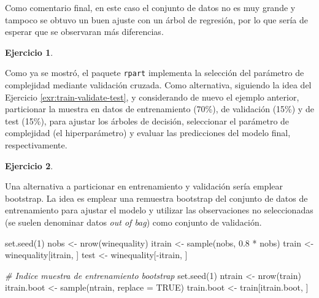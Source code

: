 \documentclass[
  spanish,
]{book}
\newenvironment{Shaded}{\begin{snugshade}}{\end{snugshade}}
\newcommand{\AttributeTok}[1]{\textcolor[rgb]{0.77,0.63,0.00}{#1}}
\newcommand{\CommentTok}[1]{\textcolor[rgb]{0.56,0.35,0.01}{\textit{#1}}}
\newcommand{\ConstantTok}[1]{\textcolor[rgb]{0.00,0.00,0.00}{#1}}
\newcommand{\DecValTok}[1]{\textcolor[rgb]{0.00,0.00,0.81}{#1}}
\newcommand{\FloatTok}[1]{\textcolor[rgb]{0.00,0.00,0.81}{#1}}
\newcommand{\FunctionTok}[1]{\textcolor[rgb]{0.00,0.00,0.00}{#1}}
\newcommand{\NormalTok}[1]{#1}
\newcommand{\OtherTok}[1]{\textcolor[rgb]{0.56,0.35,0.01}{#1}}
\newcommand{\SpecialCharTok}[1]{\textcolor[rgb]{0.00,0.00,0.00}{#1}}
\theoremstyle{break}
\theoremstyle{definition}
\theoremstyle{definition}
\theoremstyle{definition}
\newtheorem{exercise}{Ejercicio}[chapter]
\theoremstyle{definition}
\theoremstyle{remark}
\begin{document}
Como comentario final, en este caso el conjunto de datos no es muy grande y tampoco se obtuvo un buen ajuste con un árbol de regresión, por lo que sería de esperar que se observaran más diferencias.

\begin{exercise}
\protect\hypertarget{exr:train-validate-test-tree}{}{\label{exr:train-validate-test-tree} }
\end{exercise}

Como ya se mostró, el paquete \texttt{rpart} implementa la selección del parámetro de complejidad mediante validación cruzada.
Como alternativa, siguiendo la idea del Ejercicio \ref{exr:train-validate-test}, y considerando de nuevo el ejemplo anterior, particionar la muestra en datos de entrenamiento (70\%), de validación (15\%) y de test (15\%), para ajustar los árboles de decisión, seleccionar el parámetro de complejidad (el hiperparámetro) y evaluar las predicciones del modelo final, respectivamente.

\begin{exercise}
\protect\hypertarget{exr:train-boot-tree}{}{\label{exr:train-boot-tree} }
\end{exercise}

Una alternativa a particionar en entrenamiento y validación sería emplear bootstrap.
La idea es emplear una remuestra bootstrap del conjunto de datos de entrenamiento para ajustar el modelo y utilizar las observaciones no seleccionadas (se suelen denominar datos \emph{out of bag}) como conjunto de validación.

\begin{Shaded}
\begin{Highlighting}[]
\FunctionTok{set.seed}\NormalTok{(}\DecValTok{1}\NormalTok{)}
\NormalTok{nobs }\OtherTok{\textless{}{-}} \FunctionTok{nrow}\NormalTok{(winequality)}
\NormalTok{itrain }\OtherTok{\textless{}{-}} \FunctionTok{sample}\NormalTok{(nobs, }\FloatTok{0.8} \SpecialCharTok{*}\NormalTok{ nobs)}
\NormalTok{train }\OtherTok{\textless{}{-}}\NormalTok{ winequality[itrain, ]}
\NormalTok{test }\OtherTok{\textless{}{-}}\NormalTok{ winequality[}\SpecialCharTok{{-}}\NormalTok{itrain, ]}

\CommentTok{\# Indice muestra de entrenamiento bootstrap}
\FunctionTok{set.seed}\NormalTok{(}\DecValTok{1}\NormalTok{)}
\NormalTok{ntrain }\OtherTok{\textless{}{-}} \FunctionTok{nrow}\NormalTok{(train)}
\NormalTok{itrain.boot }\OtherTok{\textless{}{-}} \FunctionTok{sample}\NormalTok{(ntrain, }\AttributeTok{replace =} \ConstantTok{TRUE}\NormalTok{)}
\NormalTok{train.boot }\OtherTok{\textless{}{-}}\NormalTok{ train[itrain.boot, ]}
\end{Highlighting}
\end{Shaded}
\end{document}
